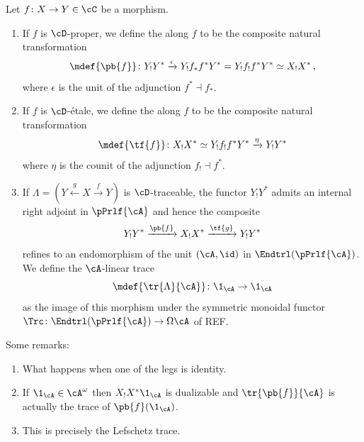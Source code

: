 \begin{cons}\label{cons: pb tf and trc}
Let $f\colon X\to Y\in \cC$ be a morphism.
\begin{enumerate}
    \item  If $f$ is $\cD$-proper, we define the  
        along $f$ to be the composite natural transformation
         \[ \mdef{\pb{f}}\colon Y_!Y^{\ast} \xrightarrow{\epsilon} Y_!f_{\ast}f^{\ast}Y^{\ast} = Y_!f_!f^{\ast}Y^{\ast} \simeq X_! X^{\ast}\,,\]
         where $\epsilon$ is the unit of the adjunction $f^{\ast}\dashv f_{\ast}$.
    \item If $f$ is $\cD$-\'etale, we define the 
          along $f$ to be the composite natural transformation 
          \[ \mdef{\tf{f}}\colon X_!X^{\ast}\simeq Y_!f_!f^{\ast}Y^{\ast}
          \xrightarrow{\eta} Y_!Y^{\ast}\]
          where $\eta$ is the counit of the adjunction $f_!\dashv f^{\ast}$.
    \item If $\Lambda= \left( Y \xleftarrow{g} X \xrightarrow{f} Y\right)$
          is $\cD$-traceable, the functor $Y_!Y^{\ast}$ admits an internal
          right adjoint in $\pPrlf{\cA}$ and hence the composite 
          \[  Y_!Y^{\ast} \xrightarrow{\pb{f}} X_!X^{\ast}\xrightarrow{\tf{g}} Y_!Y^\ast \]
          refines to an endomorphism of the unit $(\cA,\id)$ in
          $\Endtrl(\pPrlf{\cA})$. We define the $\cA$-linear trace 
  \[ \mdef{\tr{\Lambda}{\cA}} \colon \1_{\cA} \to \1_{\cA} \]
  as the image of this morphism under the symmetric monoidal functor 
  $\Trc\colon \Endtrl(\pPrlf{\cA})\to \Omega\cA$ of REF. 
    \end{enumerate}
\end{cons}

\begin{rmk}\label{rmk: about pb tf and trc}
Some remarks:
    \begin{enumerate}
        \item What happens when one of the legs is identity.
        \item If $\1_\cA\in \cA^{\omega}$ then $X_!X^{\ast}\1_{\cA}$
        is dualizable and $\tr{\pb{f}}{\cA}$ is actually the trace
        of $\pb{f}(\1_\cA)$. 
        \item This is precisely the Lefschetz trace.
    \end{enumerate}
\end{rmk}

